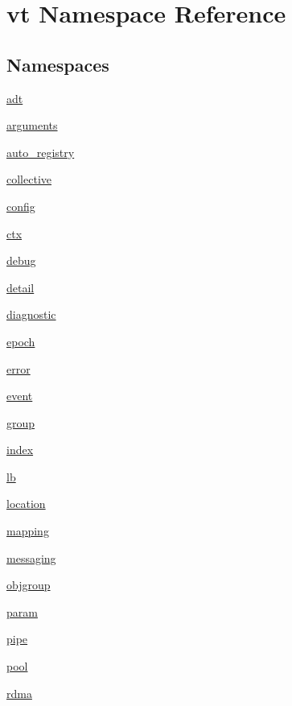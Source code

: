 \hypertarget{namespacevt}{}\section{vt Namespace Reference}
\label{namespacevt}
\subsection*{Namespaces}
\begin{DoxyCompactItemize}
\item 
 \hyperlink{namespacevt_1_1adt}{adt}
\item 
 \hyperlink{namespacevt_1_1arguments}{arguments}
\item 
 \hyperlink{namespacevt_1_1auto__registry}{auto\+\_\+registry}
\item 
 \hyperlink{namespacevt_1_1collective}{collective}
\item 
 \hyperlink{namespacevt_1_1config}{config}
\item 
 \hyperlink{namespacevt_1_1ctx}{ctx}
\item 
 \hyperlink{namespacevt_1_1debug}{debug}
\item 
 \hyperlink{namespacevt_1_1detail}{detail}
\item 
 \hyperlink{namespacevt_1_1diagnostic}{diagnostic}
\item 
 \hyperlink{namespacevt_1_1epoch}{epoch}
\item 
 \hyperlink{namespacevt_1_1error}{error}
\item 
 \hyperlink{namespacevt_1_1event}{event}
\item 
 \hyperlink{namespacevt_1_1group}{group}
\item 
 \hyperlink{namespacevt_1_1index}{index}
\item 
 \hyperlink{namespacevt_1_1lb}{lb}
\item 
 \hyperlink{namespacevt_1_1location}{location}
\item 
 \hyperlink{namespacevt_1_1mapping}{mapping}
\item 
 \hyperlink{namespacevt_1_1messaging}{messaging}
\item 
 \hyperlink{namespacevt_1_1objgroup}{objgroup}
\item 
 \hyperlink{namespacevt_1_1param}{param}
\item 
 \hyperlink{namespacevt_1_1pipe}{pipe}
\item 
 \hyperlink{namespacevt_1_1pool}{pool}
\item 
 \hyperlink{namespacevt_1_1rdma}{rdma}
\item 

\end{DoxyCompactItemize}

